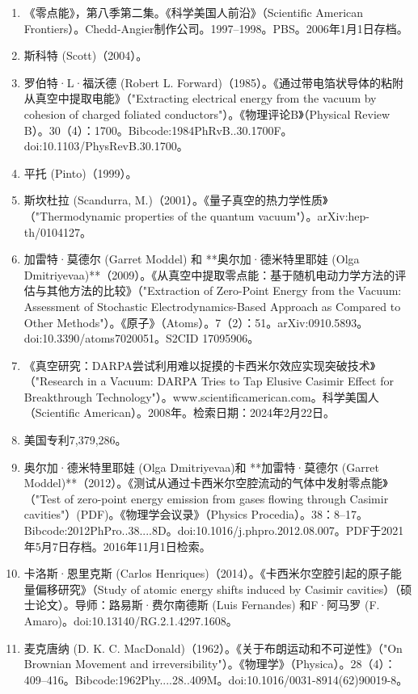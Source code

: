 \begin{enumerate}
\item 《零点能》，第八季第二集。《科学美国人前沿》（Scientific American Frontiers）。Chedd-Angier制作公司。1997–1998。PBS。2006年1月1日存档。
\item 斯科特 (Scott)（2004）。
\item 罗伯特·L·福沃德 (Robert L. Forward)（1985）。《通过带电箔状导体的粘附从真空中提取电能》（"Extracting electrical energy from the vacuum by cohesion of charged foliated conductors"）。《物理评论B》（Physical Review B）。30（4）：1700。Bibcode:1984PhRvB..30.1700F。doi:10.1103/PhysRevB.30.1700。
\item 平托 (Pinto)（1999）。
\item 斯坎杜拉 (Scandurra, M.)（2001）。《量子真空的热力学性质》（"Thermodynamic properties of the quantum vacuum"）。arXiv:hep-th/0104127。
\item 加雷特·莫德尔 (Garret Moddel) 和 **奥尔加·德米特里耶娃 (Olga Dmitriyevaa)**（2009）。《从真空中提取零点能：基于随机电动力学方法的评估与其他方法的比较》（"Extraction of Zero-Point Energy from the Vacuum: Assessment of Stochastic Electrodynamics-Based Approach as Compared to Other Methods"）。《原子》（Atoms）。7（2）：51。arXiv:0910.5893。doi:10.3390/atoms7020051。S2CID 17095906。
\item 《真空研究：DARPA尝试利用难以捉摸的卡西米尔效应实现突破技术》（"Research in a Vacuum: DARPA Tries to Tap Elusive Casimir Effect for Breakthrough Technology"）。www.scientificamerican.com。科学美国人（Scientific American）。2008年。检索日期：2024年2月22日。
\item 美国专利7,379,286。
\item 奥尔加·德米特里耶娃 (Olga Dmitriyevaa)和 **加雷特·莫德尔 (Garret Moddel)**（2012）。《测试从通过卡西米尔空腔流动的气体中发射零点能》（"Test of zero-point energy emission from gases flowing through Casimir cavities"）(PDF)。《物理学会议录》（Physics Procedia）。38：8–17。Bibcode:2012PhPro..38....8D。doi:10.1016/j.phpro.2012.08.007。PDF于2021年5月7日存档。2016年11月1日检索。
\item 卡洛斯·恩里克斯 (Carlos Henriques)（2014）。《卡西米尔空腔引起的原子能量偏移研究》（Study of atomic energy shifts induced by Casimir cavities）（硕士论文）。导师：路易斯·费尔南德斯 (Luis Fernandes) 和F·阿马罗 (F. Amaro)。doi:10.13140/RG.2.1.4297.1608。
\item 麦克唐纳 (D. K. C. MacDonald)（1962）。《关于布朗运动和不可逆性》（"On Brownian Movement and irreversibility"）。《物理学》（Physica）。28（4）：409–416。Bibcode:1962Phy....28..409M。doi:10.1016/0031-8914(62)90019-8。

\end{enumerate}
